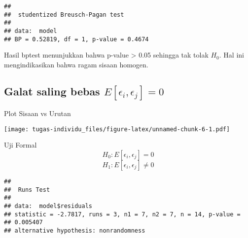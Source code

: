 \documentclass[
]{article}
\newenvironment{Shaded}{\begin{snugshade}}{\end{snugshade}}
\newcommand{\AttributeTok}[1]{\textcolor[rgb]{0.13,0.29,0.53}{#1}}
\newcommand{\DecValTok}[1]{\textcolor[rgb]{0.00,0.00,0.81}{#1}}
\newcommand{\FunctionTok}[1]{\textcolor[rgb]{0.13,0.29,0.53}{\textbf{#1}}}
\newcommand{\NormalTok}[1]{#1}
\newcommand{\SpecialCharTok}[1]{\textcolor[rgb]{0.81,0.36,0.00}{\textbf{#1}}}
\newcommand{\StringTok}[1]{\textcolor[rgb]{0.31,0.60,0.02}{#1}}
\begin{document}
\begin{verbatim}
## 
##  studentized Breusch-Pagan test
## 
## data:  model
## BP = 0.52819, df = 1, p-value = 0.4674
\end{verbatim}

Hasil bptest menunjukkan bahwa p-value \textgreater{} 0.05 sehingga tak
tolak \(H_0\). Hal ini mengindikasikan bahwa ragam sisaan homogen.

\hypertarget{galat-saling-bebas-eepsilon_i-epsilon_j-0}{%
\subsection{\texorpdfstring{Galat saling bebas
\(E[\epsilon_i, \epsilon_j] = 0\)}{Galat saling bebas E{[}\textbackslash epsilon\_i, \textbackslash epsilon\_j{]} = 0}}\label{galat-saling-bebas-eepsilon_i-epsilon_j-0}}

Plot Sisaan vs Urutan

\begin{Shaded}
\end{Shaded}

\texttt{[image: tugas-individu\_files/figure-latex/unnamed-chunk-6-1.pdf]}

Uji Formal \[H_0: E[\epsilon_i, \epsilon_j] = 0\]
\[H_1: E[\epsilon_i, \epsilon_j] \neq 0\]

\begin{Shaded}
\end{Shaded}

\begin{verbatim}
## 
##  Runs Test
## 
## data:  model$residuals
## statistic = -2.7817, runs = 3, n1 = 7, n2 = 7, n = 14, p-value =
## 0.005407
## alternative hypothesis: nonrandomness
\end{verbatim}
\end{document}
